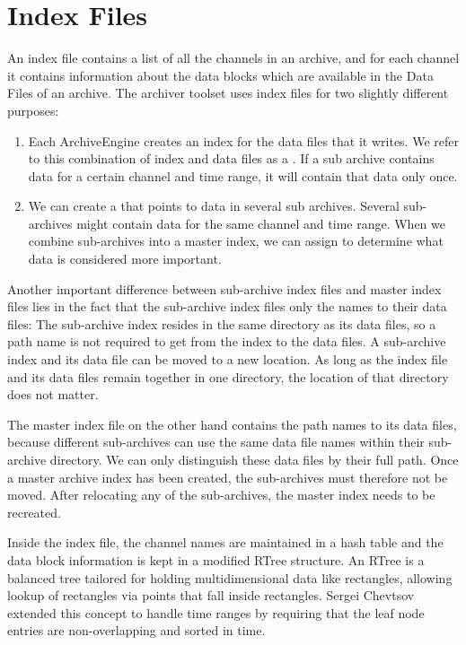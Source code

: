 \section{Index Files}
An index file contains a list of all the channels in an archive, and
for each channel it contains information about the data blocks which
are available in the Data Files of an archive.
The archiver toolset uses index files for two slightly different
purposes:
\begin{enumerate}
\item Each ArchiveEngine creates an index for the data files
      that it writes.
      We refer to this combination of index and data files
      as a .
      If a sub archive contains data for a certain channel and time
      range, it will contain that data only once.
\item We can create a  that points to data
      in several sub archives.
      Several sub-archives might contain data for the same channel
      and time range. When we combine sub-archives into a master
      index, we can assign  to
      determine what data is considered more important.
\end{enumerate}

\noindent Another important difference between sub-archive index files
and master index files lies in the fact that the sub-archive index
files only the names to their data files: The sub-archive index
resides in the same directory as its data files, so a path name is not
required to get from the index to the data files.
A sub-archive index and its data file can be moved to a new
location. As long as the index file and its data files remain
together in one directory, the location of that directory does not matter.

The master index file on the other hand contains the path names to its
data files, because different sub-archives can use the same data file
names within their sub-archive directory. We can only distinguish these
data files by their full path.  Once a master archive index has been
created, the sub-archives must therefore not be moved. After
relocating any of the sub-archives, the master index needs to be recreated.

Inside the index file, the channel names are maintained in a hash
table and the data block information is kept in a modified RTree
structure.  An RTree \cite{guttman84} is a balanced tree tailored for
holding multidimensional data like rectangles, allowing lookup of
rectangles via points that fall inside rectangles.  Sergei Chevtsov
extended this concept to handle time ranges by requiring that the leaf
node entries are non-overlapping and sorted in time.

